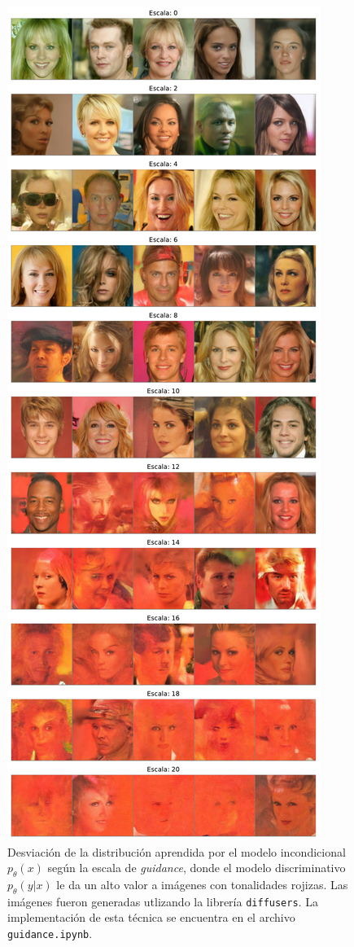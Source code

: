 \begin{figure}[!ht]
    \centering
    \includegraphics[height=0.8\textheight]{images/dm/guidance}
    \caption{Desviación de la distribución aprendida por el modelo incondicional $p_\theta(x)$ según la escala de \textit{guidance}, donde el modelo discriminativo $p_\theta(y|x)$ le da un alto valor a imágenes con tonalidades rojizas. Las imágenes fueron generadas utlizando la librería \texttt{diffusers}. La implementación de esta técnica se encuentra en el archivo \texttt{guidance.ipynb}.}
    \label{fig:dm/guidance}
\end{figure}

